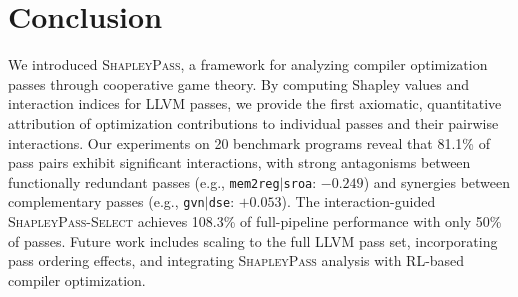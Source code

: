 \documentclass{article}
\begin{document}
\section{Conclusion}
\label{sec:conclusion}

We introduced \textsc{ShapleyPass}, a framework for analyzing compiler optimization passes through cooperative game theory. By computing Shapley values and interaction indices for LLVM passes, we provide the first axiomatic, quantitative attribution of optimization contributions to individual passes and their pairwise interactions. Our experiments on 20 benchmark programs reveal that 81.1\% of pass pairs exhibit significant interactions, with strong antagonisms between functionally redundant passes (e.g., \texttt{mem2reg}$|$\texttt{sroa}: $-0.249$) and synergies between complementary passes (e.g., \texttt{gvn}$|$\texttt{dse}: $+0.053$). The interaction-guided \textsc{ShapleyPass-Select} achieves 108.3\% of full-pipeline performance with only 50\% of passes. Future work includes scaling to the full LLVM pass set, incorporating pass ordering effects, and integrating \textsc{ShapleyPass} analysis with RL-based compiler optimization.
\end{document}
